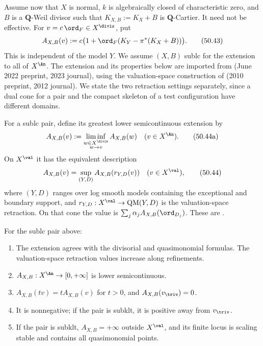 Assume now that $X$ is normal, $k$ is algebraically closed of
characteristic zero, and $B$ is a $\mathbf Q$-Weil divisor such that
$K_{X,B}:=K_X+B$ is $\mathbf Q$-Cartier.  It need not be effective.
For $v=c\,\ord_F\in X^{\divis}$, put
\[
             A_{X,B}(v)
             :=c\bigl(1+\ord_F(K_Y-\pi^*(K_X+B))\bigr).
\tag{50.43}\label{eq:stability-log-discrepancy}
\]
This is independent of the model $Y$.  We assume $(X,B)$ sublc for
the extension to all of $X^{\An}$.  The extension and its properties
below are imported from \cite[Appendix~A]{BJKS2} (June 2022 preprint,
2023 journal), using the valuation-space construction of \cite{JM12}
(2010 preprint, 2012 journal).  We state the two retraction settings
separately, since a dual cone for a pair and the compact skeleton of a
test configuration have different domains.

\begin{definition}
\label{def:ch50-A-extension}
For a sublc pair, define its greatest lower semicontinuous extension by
\[
 A_{X,B}(v):=\liminf_{\substack{w\in X^{\divis}\\w\to v}}A_{X,B}(w)
 \quad(v\in X^{\An}).
\tag{50.44a}\label{eq:ch50-A-lsc-extension}
\]
On $X^{\val}$ it has the equivalent description
\[
 A_{X,B}(v)=\sup_{(Y,D)} A_{X,B}(r_{Y,D}(v))
 \quad(v\in X^{\val}),
\tag{50.44}\label{eq:ch50-A-sup-retractions}
\]
where $(Y,D)$ ranges over log smooth models containing the exceptional
and boundary support, and $r_{Y,D}:X^{\val}\to\operatorname{QM}(Y,D)$
is the valuation-space retraction.  On that cone the value is
$\sum_j\alpha_j A_{X,B}(\ord_{D_j})$.
These are \cite[Definitions~A.2 and~A.5, Propositions~A.3--A.4]{BJKS2}.
\end{definition}

\begin{proposition}
\label{prop:ch50-A-properties}
For the sublc pair above:
\begin{enumerate}
\item\label{itm:ch50-A:consistent}
      The extension agrees with the divisorial and quasimonomial formulas.
      The valuation-space retraction values increase along refinements.
\item\label{itm:ch50-A:lsc}
      $A_{X,B}:X^{\An}\to[0,+\infty]$ is lower semicontinuous.
\item\label{itm:ch50-A:homog}
      $A_{X,B}(tv)=tA_{X,B}(v)$ for $t>0$, and
      $A_{X,B}(v_{\triv})=0$.
\item\label{itm:ch50-A:sign}
      It is nonnegative; if the pair is subklt, it is positive away from
      $v_{\triv}$.
\item\label{itm:ch50-A:infinite}
      If the pair is subklt, $A_{X,B}=+\infty$ outside $X^{\val}$,
      and its finite locus is scaling stable and contains all
      quasimonomial points.
\end{enumerate}
\end{proposition}

